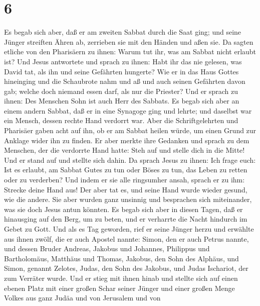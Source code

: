 \hypertarget{section-5}{%
\section{6}\label{section-5}}

 Es begab sich aber, daß er am zweiten Sabbat durch die
Saat ging; und seine Jünger streiften Ähren ab, zerrieben sie mit den
Händen und aßen sie.  Da sagten etliche von den Pharisäern
zu ihnen: Warum tut ihr, was am Sabbat nicht erlaubt ist? 
Und Jesus antwortete und sprach zu ihnen: Habt ihr das nie gelesen, was
David tat, als ihn und seine Gefährten hungerte?  Wie er
in das Haus Gottes hineinging und die Schaubrote nahm und aß und auch
seinen Gefährten davon gab; welche doch niemand essen darf, als nur die
Priester?  Und er sprach zu ihnen: Des Menschen Sohn ist
auch Herr des Sabbats.  Es begab sich aber an einem andern
Sabbat, daß er in eine Synagoge ging und lehrte; und daselbst war ein
Mensch, dessen rechte Hand verdorrt war.  Aber die
Schriftgelehrten und Pharisäer gaben acht auf ihn, ob er am Sabbat
heilen würde, um einen Grund zur Anklage wider ihn zu finden.
 Er aber merkte ihre Gedanken und sprach zu dem Menschen,
der die verdorrte Hand hatte: Steh auf und stelle dich in die Mitte! Und
er stand auf und stellte sich dahin.  Da sprach Jesus zu
ihnen: Ich frage euch: Ist es erlaubt, am Sabbat Gutes zu tun oder Böses
zu tun, das Leben zu retten oder zu verderben?  Und indem
er sie alle ringsumher ansah, sprach er zu ihm: Strecke deine Hand aus!
Der aber tat es, und seine Hand wurde wieder gesund, wie die andere.
 Sie aber wurden ganz unsinnig und besprachen sich
miteinander, was sie doch Jesus antun könnten.  Es begab
sich aber in diesen Tagen, daß er hinausging auf den Berg, um zu beten,
und er verharrte die Nacht hindurch im Gebet zu Gott. 
Und als es Tag geworden, rief er seine Jünger herzu und erwählte aus
ihnen zwölf, die er auch Apostel nannte:  Simon, den er
auch Petrus nannte, und dessen Bruder Andreas, Jakobus und Johannes,
Philippus und Bartholomäus,  Matthäus und Thomas,
Jakobus, den Sohn des Alphäus, und Simon, genannt Zelotes,
 Judas, den Sohn des Jakobus, und Judas Ischariot, der
zum Verräter wurde.  Und er stieg mit ihnen hinab und
stellte sich auf einen ebenen Platz mit einer großen Schar seiner Jünger
und einer großen Menge Volkes aus ganz Judäa und von Jerusalem und von
